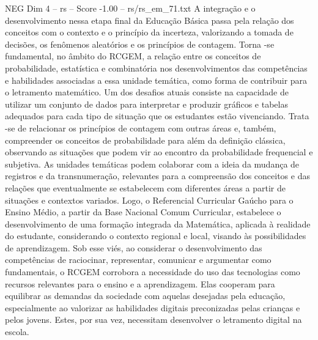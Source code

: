 \begin{textsample}{NEG Dim 4 – rs – Score -1.00 – rs/rs\_em\_71.txt}
A integração e o desenvolvimento nessa etapa final da Educação Básica passa pela relação dos conceitos com o contexto e o princípio da incerteza, valorizando a tomada de decisões, os fenômenos aleatórios e os princípios de contagem.
Torna -se fundamental, no âmbito do RCGEM, a relação entre os conceitos de probabilidade, estatística e combinatória nos desenvolvimentos das competências e habilidades associadas a essa unidade temática, como forma de contribuir para o letramento matemático.
Um dos desafios atuais consiste na capacidade de utilizar um conjunto de dados para interpretar e produzir gráficos e tabelas adequados para cada tipo de situação que os estudantes estão vivenciando.
Trata -se de relacionar os princípios de contagem com outras áreas e, também, compreender os conceitos de probabilidade para além da definição clássica, observando as situações que podem vir ao encontro da probabilidade frequencial e subjetiva.
As unidades temáticas podem colaborar com a ideia da mudança de registros e da transnumeração, relevantes para a compreensão dos conceitos e das relações que eventualmente se estabelecem com diferentes áreas a partir de situações e contextos variados.
Logo, o Referencial Curricular Gaúcho para o Ensino Médio, a partir da Base Nacional Comum Curricular, estabelece o desenvolvimento de uma formação integrada da Matemática, aplicada à realidade do estudante, considerando o contexto regional e local, visando às possibilidades de aprendizagem.
Sob esse viés, ao considerar o desenvolvimento das competências de raciocinar, representar, comunicar e argumentar como fundamentais, o RCGEM corrobora a necessidade do uso das tecnologias como recursos relevantes para o ensino e a aprendizagem.
Elas cooperam para equilibrar as demandas da sociedade com aquelas desejadas pela educação, especialmente ao valorizar as habilidades digitais preconizadas pelas crianças e pelos jovens.
Estes, por sua vez, necessitam desenvolver o letramento digital na escola.

\end{textsample}
